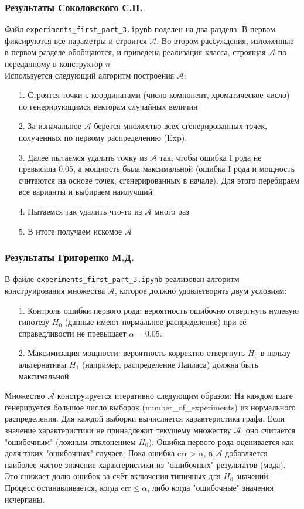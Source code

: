 \documentclass[a4paper,12pt]{article}
\begin{document}
\subsubsection*{Результаты Соколовского С.П.}
Файл \texttt{experiments\_first\_part\_3.ipynb} поделен на два раздела. В первом фиксируются все параметры и строится $\mathcal{A}$. Во втором рассуждения, изложенные в первом разделе обобщаются, и приведена реализация класса, строящая $\mathcal{A}$ по переданному в конструктор $n$ \\
Используется следующий алгоритм построения $\mathcal{A}$:
\begin{itemize}
    \item[1.] Строятся точки с координатами (число компонент, хроматическое число) по генерирующимся векторам случайных величин
    \item[2.] За изначальное $\mathcal{A}$ берется множество всех сгенерированных точек, полученных по первому распределению (Exp).
    \item[3.] Далее пытаемся удалить точку из $\mathcal{A}$ так, чтобы ошибка I рода не превысила 0.05, а мощность была максимальной (ошибка I рода и мощность считаются на основе точек, сгенерированных в начале). Для этого перебираем все варианты и выбираем наилучший
    \item[4.] Пытаемся так удалить что-то из $\mathcal{A}$ много раз
    \item[5.] В итоге получаем искомое $\mathcal{A}$
\end{itemize}
\subsubsection*{Результаты Григоренко М.Д.}
В файле \texttt{experiments\_first\_part\_3.ipynb} реализован алгоритм конструирования множества $\mathcal{A}$, которое должно удовлетворять двум условиям:

\begin{itemize}
\item[1.] Контроль ошибки первого рода: вероятность ошибочно отвергнуть нулевую гипотезу $H_0$ (данные имеют нормальное распределение) при её справедливости не превышает $\alpha = 0.05$.

\item[2.] Максимизация мощности: вероятность корректно отвергнуть $H_0$ в пользу альтернативы $H_1$ (например, распределение Лапласа) должна быть максимальной.
\end{itemize}

Множество $\mathcal{A}$ конструируется итеративно следующим образом:
На каждом шаге генерируется большое число выборок (number\_of\_experiments) из нормального распределения. Для каждой выборки вычисляется характеристика графа. Если значение характеристики не принадлежит текущему множеству $\mathcal{A}$, оно считается "ошибочным" (ложным отклонением $H_0$). Ошибка первого рода оценивается как доля таких "ошибочных" случаев:
Пока ошибка $\text{err} > \alpha$, в $\mathcal{A}$ добавляется наиболее частое значение характеристики из "ошибочных" результатов (мода). Это снижает долю ошибок за счёт включения типичных для $H_0$ значений.
Процесс останавливается, когда $\text{err} \leq \alpha$, либо когда "ошибочные" значения исчерпаны.
\end{document}
